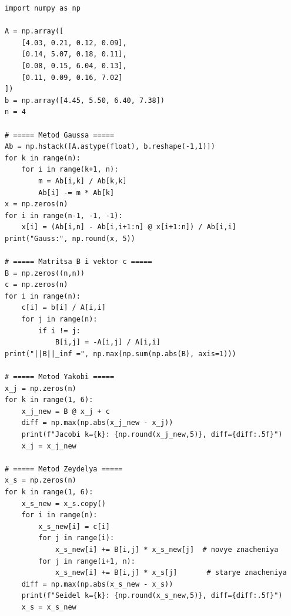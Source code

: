 \documentclass[a4paper, final]{article}
\begin{document}
\begin{lstlisting}[caption={Метод Гаусса и итерационные методы}, label=lst:code]
import numpy as np

A = np.array([
    [4.03, 0.21, 0.12, 0.09],
    [0.14, 5.07, 0.18, 0.11],
    [0.08, 0.15, 6.04, 0.13],
    [0.11, 0.09, 0.16, 7.02]
])
b = np.array([4.45, 5.50, 6.40, 7.38])
n = 4

# ===== Metod Gaussa =====
Ab = np.hstack([A.astype(float), b.reshape(-1,1)])
for k in range(n):
    for i in range(k+1, n):
        m = Ab[i,k] / Ab[k,k]
        Ab[i] -= m * Ab[k]
x = np.zeros(n)
for i in range(n-1, -1, -1):
    x[i] = (Ab[i,n] - Ab[i,i+1:n] @ x[i+1:n]) / Ab[i,i]
print("Gauss:", np.round(x, 5))

# ===== Matritsa B i vektor c =====
B = np.zeros((n,n))
c = np.zeros(n)
for i in range(n):
    c[i] = b[i] / A[i,i]
    for j in range(n):
        if i != j:
            B[i,j] = -A[i,j] / A[i,i]
print("||B||_inf =", np.max(np.sum(np.abs(B), axis=1)))

# ===== Metod Yakobi =====
x_j = np.zeros(n)
for k in range(1, 6):
    x_j_new = B @ x_j + c
    diff = np.max(np.abs(x_j_new - x_j))
    print(f"Jacobi k={k}: {np.round(x_j_new,5)}, diff={diff:.5f}")
    x_j = x_j_new

# ===== Metod Zeydelya =====
x_s = np.zeros(n)
for k in range(1, 6):
    x_s_new = x_s.copy()
    for i in range(n):
        x_s_new[i] = c[i]
        for j in range(i):
            x_s_new[i] += B[i,j] * x_s_new[j]  # novye znacheniya
        for j in range(i+1, n):
            x_s_new[i] += B[i,j] * x_s[j]       # starye znacheniya
    diff = np.max(np.abs(x_s_new - x_s))
    print(f"Seidel k={k}: {np.round(x_s_new,5)}, diff={diff:.5f}")
    x_s = x_s_new
\end{lstlisting}
\end{document}
